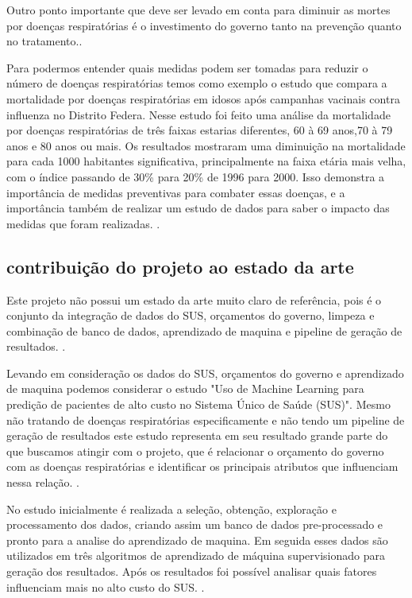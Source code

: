 \documentclass[journal]{IEEEtran}
\begin{document}
Outro ponto importante que deve ser levado em conta para diminuir as mortes por doenças respiratórias é o investimento do governo tanto na prevenção quanto no tratamento.\cite{campanha_vacinais}.

Para podermos entender quais medidas podem ser tomadas para reduzir o número de doenças respiratórias temos como exemplo o estudo que compara a mortalidade por doenças respiratórias em idosos após campanhas vacinais contra influenza no Distrito Federa. Nesse estudo foi feito uma análise da mortalidade por doenças respiratórias de três faixas estarias diferentes, 60 à 69 anos,70 à 79 anos e 80 anos ou mais. Os resultados mostraram uma diminuição na mortalidade para cada 1000 habitantes significativa, principalmente na faixa etária mais velha, com o índice passando de 30\% para 20\% de 1996 para 2000. Isso demonstra a importância de medidas preventivas para combater essas doenças, e a importância também de realizar um estudo de dados para saber o impacto das medidas que foram realizadas.     \cite{campanha_vacinais}.


\subsection{contribuição do projeto ao estado da arte}
Este projeto não possui um estado da arte muito claro de referência, pois é o conjunto da integração de dados do SUS, orçamentos do governo, limpeza e combinação de banco de dados, aprendizado de maquina e pipeline de geração de resultados. \cite{estado_arte}.

Levando em consideração os dados do SUS, orçamentos do governo e aprendizado de maquina podemos considerar o estudo "Uso de Machine Learning para predição de pacientes de alto custo no Sistema Único de Saúde (SUS)". Mesmo não tratando de doenças respiratórias especificamente e não tendo um pipeline de geração de resultados este estudo representa em seu resultado grande parte do que buscamos atingir com o projeto, que é relacionar o orçamento do governo com as doenças respiratórias e identificar os principais atributos que influenciam nessa relação. \cite{estado_arte}.

No estudo inicialmente é realizada a seleção, obtenção, exploração e processamento dos dados, criando assim um banco de dados pre-processado e pronto para a analise do aprendizado de maquina. Em seguida esses dados são utilizados em três algoritmos de aprendizado de máquina supervisionado para geração dos resultados. Após os resultados foi possível analisar quais fatores influenciam mais no alto custo do SUS.   \cite{estado_arte}.
\end{document}
